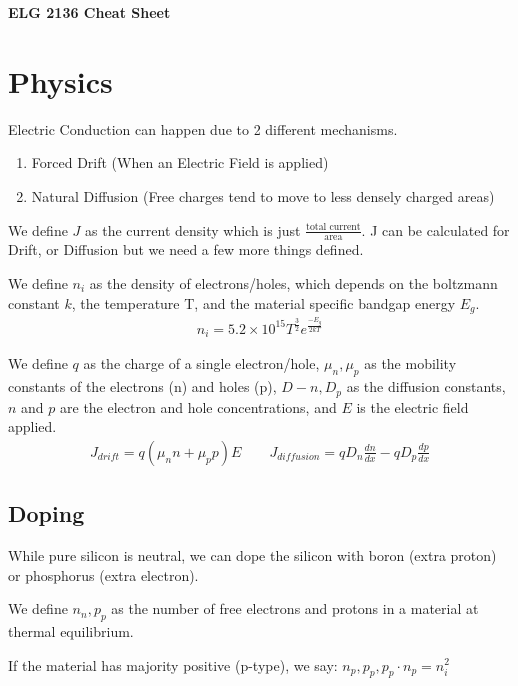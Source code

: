 \documentclass[12pt,letterpaper]{article} \usepackage{amsmath} \usepackage{graphicx} \usepackage[margin=1in]{geometry} \usepackage{longtable}  \usepackage{amssymb}
\begin{document}
	
	\begin{center}
		\Large\textbf{ELG 2136 Cheat Sheet} \\
		\vspace{0.5em}
	\end{center}	

	\section{Physics}
	Electric Conduction can happen due to 2 different mechanisms. 
	\begin{enumerate}[]	
		\item Forced Drift (When an Electric Field is applied)
		\item Natural Diffusion (Free charges tend to move to less densely charged areas)
	\end{enumerate}

	We define \textbf{$J$} as the current density which is just $\frac{\text{total current}}{\text {area}}$. J can be calculated for Drift, or Diffusion but we need a few more things defined. 
	
	We define $n_i$ as the density of electrons/holes, which depends on the boltzmann constant $k$, the temperature T, and the material specific bandgap energy $E_g$. 
	\begin{align*}
		n_i = 5.2\times 10^{15} T^{\frac{3}{2}} e^\frac{-E_g}{2kT}
	\end{align*}

	We define $q$ as the charge of a single electron/hole, $\mu_n, \mu_p$ as the mobility constants of the electrons (n) and holes (p), $D-n, D_p$ as the diffusion constants, $n$ and $p$ are the electron and hole concentrations, and $E$ is the electric field applied.
	\begin{align*}
		J_{drift} = q(\mu_n n+ \mu_p p) E \qquad J_{diffusion} = qD_n \frac{dn}{dx} - qD_p \frac{dp}{dx}
	\end{align*} 

	\subsection{Doping}
	While pure silicon is neutral, we can dope the silicon with boron (extra proton) or phosphorus (extra electron).
	
	We define $n_n, p_p$ as the number of free electrons and protons in a material at thermal equilibrium.
	
	If the material has majority positive (p-type), we say: $n_p, p_p, p_p\cdot n_p = n_i^2$
	
\end{document}
